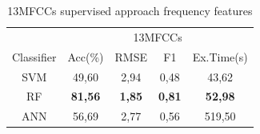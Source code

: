 \documentclass[conference]{IEEEtran}
\begin{document}
\begin{table}[!ht]
    \centering
    \caption{13MFCCs supervised approach frequency features}
    \label{tab:13MFCCs Frequency Features Table Results}
    \begin{tabular}{c c c c c}
    \toprule
    &\multicolumn{4}{c}{13MFCCs}\\
    \cmidrule{2-5}
        Classifier  &Acc(\%) &RMSE &F1 &Ex.Time(s)\\
    \midrule 
        SVM             &49,60  &2,94 &0,48 &43,62\\    
        RF              &\textbf{81,56}&\textbf{1,85}&\textbf{0,81}&\textbf{52,98}\\
        ANN             &56,69  &2,77 &0,56 &519,50\\
    \bottomrule
    \end{tabular}
\end{table} 
\end{document}

